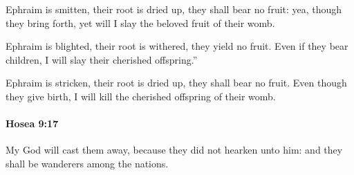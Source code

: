 			\begin{versebox}
					\item[BHS] 
					\item[LXX] 
					\item[ASV] Ephraim is smitten, their root is dried up, they shall bear no fruit: yea, though they bring forth, yet will I slay the beloved fruit of their womb.
					\item[NIV] Ephraim is blighted, their root is withered, they yield no fruit. Even if they bear children, I will slay their cherished offspring.”
					\item[NRSV] Ephraim is stricken, their root is dried up, they shall bear no fruit. Even though they give birth, I will kill the cherished offspring of their womb.
			\end{versebox}

		\paragraph{Hosea 9:17} %
			\label{HOSEA-9-17}

			My God will cast them away, because they did not hearken unto him: and they shall be wanderers among the nations.


